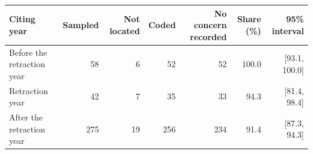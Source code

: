 
\begin{tabular}[t]{lrrrrrr}
\toprule
Citing year & Sampled & Not located & Coded & No concern recorded & Share (\%) & 95\% interval\\
\midrule
Before the retraction year & 58 & 6 & 52 & 52 & 100.0 & {}[93.1, 100.0]\\
Retraction year & 42 & 7 & 35 & 33 & 94.3 & {}[81.4, 98.4]\\
After the retraction year & 275 & 19 & 256 & 234 & 91.4 & {}[87.3, 94.3]\\
\bottomrule
\end{tabular}
